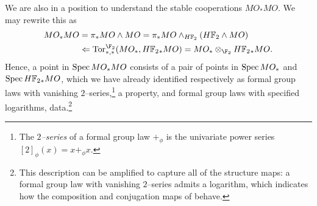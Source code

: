 \begin{remark}
We are also in a position to understand the stable cooperations \(MO_* MO\).  We may rewrite this as
\begin{align*}
MO_* MO & = \pi_* MO \sm MO = \pi_* MO \sm_{\HFtwo} (\HFtwo \sm MO) \\
& \Leftarrow \Tor^{\F_2}_{*, *}(MO_*, \HFtwo_* MO) = MO_* \otimes_{\F_2} \HFtwo_* MO.
\end{align*}
Hence, a point in \(\operatorname{Spec} MO_* MO\) consists of a pair of points in \(\operatorname{Spec} MO_*\) and \(\Spec \HFtwo_* MO\), which we have already identified respectively as formal group laws with vanishing \(2\)--series,\footnote{The \textit{\(2\)--series} of a formal group law \(+_\phi\) is the univariate power series \([2]_\phi(x) = x +_\phi x\).} a property, and formal group laws with specified logarithms, data.\footnote{This description can be amplified to capture all of the structure maps: a formal group law with vanishing \(2\)--series admits a logarithm, which indicates how the composition and conjugation maps of  behave.}
\end{remark}



